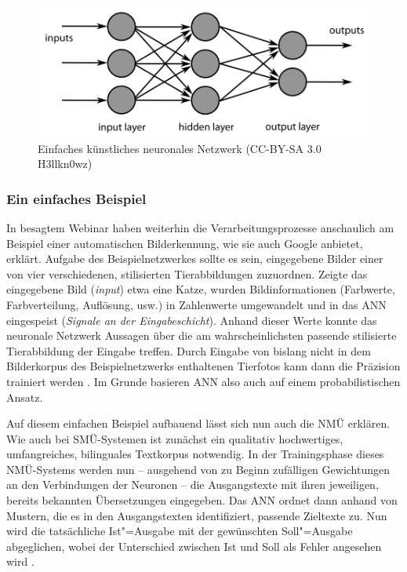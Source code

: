 \begin{figure}
    \includegraphics[width=.75\textwidth]{Figures/MultiLayerNeuralNetworkBigger_english.png}
	\caption{Einfaches künstliches neuronales Netzwerk (CC-BY-SA 3.0 H3llkn0wz)\label{K3:fig:einfachesANN}}
\end{figure}

\subsubsection{Ein einfaches Beispiel}

In besagtem Webinar haben \citet{cattelan_introduction_2017} weiterhin die Verarbeitungsprozesse anschaulich am Beispiel einer automatischen Bilderkennung, wie sie auch Google anbietet, erklärt. Aufgabe des Beispielnetzwerkes sollte es sein, eingegebene Bilder einer von vier verschiedenen, stilisierten Tierabbildungen zuzuordnen. Zeigte das eingegebene Bild (\emph{input}) etwa eine Katze, wurden Bildinformationen (Farbwerte, Farbverteilung, Auflösung, usw.) in Zahlenwerte umgewandelt und in das ANN eingespeist (\emph{Signale an der Eingabeschicht}). Anhand dieser Werte konnte das neuronale Netzwerk Aussagen über die am wahrscheinlichsten passende stilisierte Tierabbildung der Eingabe treffen. Durch Eingabe von bislang nicht in dem Bilderkorpus des Beispielnetzwerks enthaltenen Tierfotos kann dann die Präzision trainiert werden \citep[]{cattelan_introduction_2017}. Im Grunde basieren ANN also auch auf einem probabilistischen Ansatz. 

Auf diesem einfachen Beispiel aufbauend lässt sich nun auch die NMÜ erklären. Wie auch bei SMÜ-Systemen ist zunächst ein qualitativ hochwertiges, umfangreiches, bilinguales Textkorpus notwendig. In der Trainingsphase dieses NMÜ-Systems werden nun -- ausgehend von zu Beginn zufälligen Gewichtungen an den Verbindungen der Neuronen -- die Ausgangstexte mit ihren jeweiligen, bereits bekannten Übersetzungen eingegeben. Das ANN ordnet dann anhand von Mustern, die es in den Ausgangstexten identifiziert, passende Zieltexte zu. Nun wird die tatsächliche Ist"=Ausgabe mit der gewünschten Soll"=Ausgabe abgeglichen, wobei der Unterschied zwischen Ist und Soll als Fehler angesehen wird \citep[40]{kruger_von_2017}.

